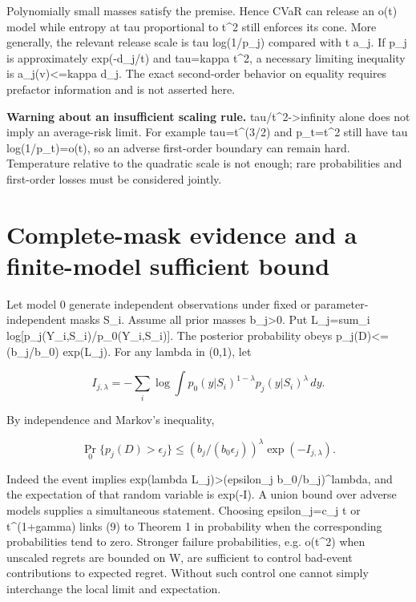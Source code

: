 \documentclass[10pt]{article}
\begin{document}
Polynomially small masses satisfy the premise. Hence CVaR can release an o(t) model while entropy at tau proportional to t\textasciicircum{}2 still enforces its cone. More generally, the relevant release scale is tau log(1/p\_j) compared with t a\_j. If p\_j is approximately exp(-d\_j/t) and tau=kappa t\textasciicircum{}2, a necessary limiting inequality is a\_j(v)<=kappa d\_j. The exact second-order behavior on equality requires prefactor information and is not asserted here.

\textbf{Warning about an insufficient scaling rule.} tau/t\textasciicircum{}2->infinity alone does not imply an average-risk limit. For example tau=t\textasciicircum{}(3/2) and p\_t=t\textasciicircum{}2 still have tau log(1/p\_t)=o(t), so an adverse first-order boundary can remain hard. Temperature relative to the quadratic scale is not enough; rare probabilities and first-order losses must be considered jointly.

\section{Complete-mask evidence and a finite-model sufficient bound}

Let model 0 generate independent observations under fixed or parameter-independent masks S\_i. Assume all prior masses b\_j>0. Put L\_j=sum\_i log[p\_j(Y\_i,S\_i)/p\_0(Y\_i,S\_i)]. The posterior probability obeys p\_j(D)<= (b\_j/b\_0) exp(L\_j). For any lambda in (0,1), let

\[
I_{j,\lambda}=-\sum_i\log\int p_0(y|S_i)^{1-\lambda}p_j(y|S_i)^\lambda\,dy.
\]



By independence and Markov's inequality,

\begin{equation}
\Pr_0\{p_j(D)>\epsilon_j\}
\leq (b_j/(b_0\epsilon_j))^\lambda\exp(-I_{j,\lambda}).\tag{9}
\end{equation}



Indeed the event implies exp(lambda L\_j)>(epsilon\_j b\_0/b\_j)\textasciicircum{}lambda, and the expectation of that random variable is exp(-I). A union bound over adverse models supplies a simultaneous statement. Choosing epsilon\_j=c\_j t or t\textasciicircum{}(1+gamma) links (9) to Theorem 1 in probability when the corresponding probabilities tend to zero. Stronger failure probabilities, e.g. o(t\textasciicircum{}2) when unscaled regrets are bounded on W, are sufficient to control bad-event contributions to expected regret. Without such control one cannot simply interchange the local limit and expectation.
\end{document}
